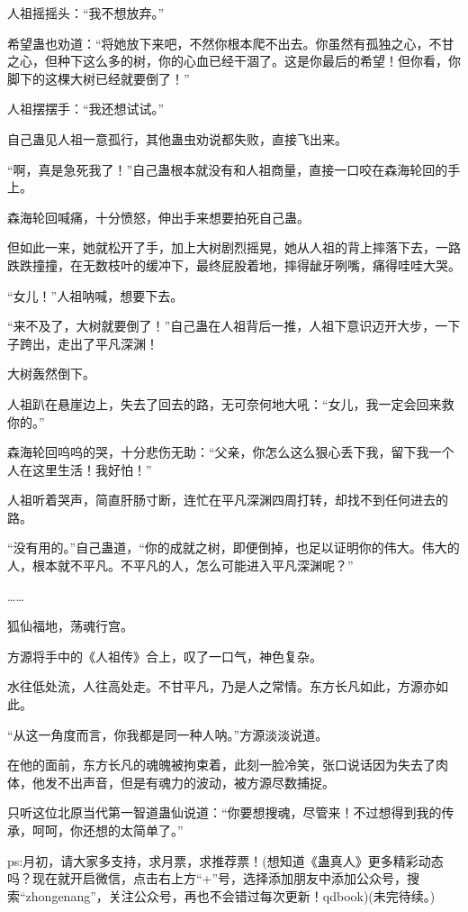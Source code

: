 \begin{this_body}
人祖摇摇头：“我不想放弃。”

希望蛊也劝道：“将她放下来吧，不然你根本爬不出去。你虽然有孤独之心，不甘之心，但种下这么多的树，你的心血已经干涸了。这是你最后的希望！但你看，你脚下的这棵大树已经就要倒了！”

人祖摆摆手：“我还想试试。”

自己蛊见人祖一意孤行，其他蛊虫劝说都失败，直接飞出来。

“啊，真是急死我了！”自己蛊根本就没有和人祖商量，直接一口咬在森海轮回的手上。

森海轮回喊痛，十分愤怒，伸出手来想要拍死自己蛊。

但如此一来，她就松开了手，加上大树剧烈摇晃，她从人祖的背上摔落下去，一路跌跌撞撞，在无数枝叶的缓冲下，最终屁股着地，摔得龇牙咧嘴，痛得哇哇大哭。

“女儿！”人祖呐喊，想要下去。

“来不及了，大树就要倒了！”自己蛊在人祖背后一推，人祖下意识迈开大步，一下子跨出，走出了平凡深渊！

大树轰然倒下。

人祖趴在悬崖边上，失去了回去的路，无可奈何地大吼：“女儿，我一定会回来救你的。”

森海轮回呜呜的哭，十分悲伤无助：“父亲，你怎么这么狠心丢下我，留下我一个人在这里生活！我好怕！”

人祖听着哭声，简直肝肠寸断，连忙在平凡深渊四周打转，却找不到任何进去的路。

“没有用的。”自己蛊道，“你的成就之树，即便倒掉，也足以证明你的伟大。伟大的人，根本就不平凡。不平凡的人，怎么可能进入平凡深渊呢？”

……

狐仙福地，荡魂行宫。

方源将手中的《人祖传》合上，叹了一口气，神色复杂。

水往低处流，人往高处走。不甘平凡，乃是人之常情。东方长凡如此，方源亦如此。

“从这一角度而言，你我都是同一种人呐。”方源淡淡说道。

在他的面前，东方长凡的魂魄被拘束着，此刻一脸冷笑，张口说话因为失去了肉体，他发不出声音，但是有魂力的波动，被方源尽数捕捉。

只听这位北原当代第一智道蛊仙说道：“你要想搜魂，尽管来！不过想得到我的传承，呵呵，你还想的太简单了。”

ps:月初，请大家多支持，求月票，求推荐票！(想知道《蛊真人》更多精彩动态吗？现在就开启微信，点击右上方“+”号，选择添加朋友中添加公众号，搜索“zhongenang”，关注公众号，再也不会错过每次更新！qdbook)(未完待续。)

\end{this_body}

